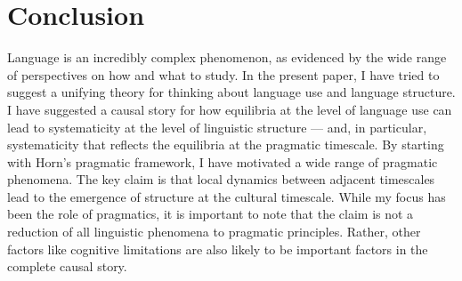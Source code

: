 \documentclass[man, noapacite, 12pt]{apa2}
\begin{document}






\section{Conclusion} 
Language is an incredibly complex phenomenon, as evidenced by the wide range of perspectives on how and what to study. In the present paper, I have tried to suggest a unifying theory for thinking about language use and language structure. I have suggested a causal story for how  equilibria at the level of language use can lead to systematicity at the level of linguistic structure --- and, in particular, systematicity that reflects the equilibria at the pragmatic timescale. By starting with Horn's pragmatic framework, I have motivated a wide range of pragmatic phenomena. The key claim is that local dynamics between adjacent timescales lead to the emergence of structure at the cultural timescale. While my focus has been the role of pragmatics, it is important to note that  the claim is not a reduction of all linguistic phenomena to pragmatic principles. Rather, other factors like cognitive limitations are also likely to be important factors in the complete causal story.
\end{document}
